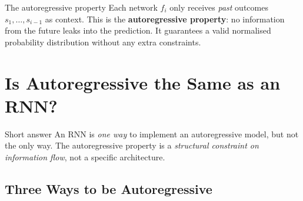 \documentclass[11pt, a4paper]{article}
\begin{document}
\vspace{0.5em}

\begin{keybox}{The autoregressive property}
Each network $f_i$ only receives \emph{past} outcomes $s_1, \ldots, s_{i-1}$
as context. This is the \textbf{autoregressive property}: no information from
the future leaks into the prediction. It guarantees a valid normalised
probability distribution without any extra constraints.
\end{keybox}

\section{Is Autoregressive the Same as an RNN?}

\begin{intuitionbox}{Short answer}
An RNN is \emph{one way} to implement an autoregressive model, but not the
only way. The autoregressive property is a \emph{structural constraint on
information flow}, not a specific architecture.
\end{intuitionbox}

\subsection{Three Ways to be Autoregressive}
\end{document}
